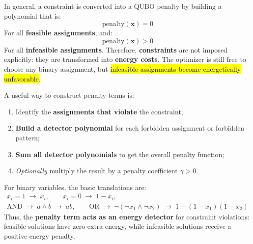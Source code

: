 \highspace
In general, a constraint is converted into a QUBO penalty by building a polynomial that is:
\begin{equation*}
    \text{penalty}(\mathbf{x}) = 0
\end{equation*}
For all \textbf{feasible assignments}, and:
\begin{equation*}
    \text{penalty}(\mathbf{x}) > 0
\end{equation*}
For all \textbf{infeasible assignments}. Therefore, \textbf{constraints} are not imposed explicitly: they are transformed into \textbf{energy costs}. The optimizer is still free to choose any binary assignment, but \hl{infeasible assignments become energetically unfavorable}.

\highspace
A useful way to construct penalty terms is:
\begin{enumerate}
    \item Identify the \textbf{assignments that violate} the constraint;
    \item \textbf{Build a detector polynomial} for each forbidden assignment or forbidden pattern;
    \item \textbf{Sum all detector polynomials} to get the overall penalty function;
    \item \emph{Optionally} multiply the result by a penalty coefficient $\gamma > 0$.
\end{enumerate}
For binary variables, the basic translations are:
\begin{gather*}
    x_i = 1 \;\to\; x_i,
    \qquad
    x_i = 0 \;\to\; 1-x_i,
    \\
    \text{AND} \;\to\; a \land b \;\to\; ab,
    \qquad
    \text{OR} \;\to\; \lnot(\lnot x_1 \land \lnot x_2) \; \to\; 1 - (1-x_1)(1-x_2)
\end{gather*}
Thus, the \textbf{penalty term acts as an energy detector} for constraint violations: feasible solutions have zero extra energy, while infeasible solutions receive a positive energy penalty.